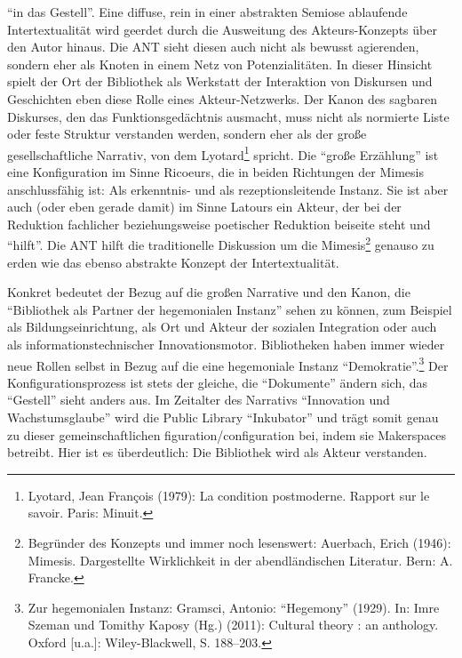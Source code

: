 \enquote{in das Gestell}. Eine diffuse, rein in einer abstrakten Semiose
ablaufende Intertextualität wird geerdet durch die Ausweitung des
Akteurs-Konzepts über den Autor hinaus. Die ANT sieht diesen auch nicht
als bewusst agierenden, sondern eher als Knoten in einem Netz von
Potenzialitäten. In dieser Hinsicht spielt der Ort der Bibliothek als
Werkstatt der Interaktion von Diskursen und Geschichten eben diese Rolle
eines Akteur-Netzwerks. Der Kanon des sagbaren Diskurses, den das
Funktionsgedächtnis ausmacht, muss nicht als normierte Liste oder feste
Struktur verstanden werden, sondern eher als der große gesellschaftliche
Narrativ, von dem Lyotard\footnote{Lyotard, Jean François (1979): La
  condition postmoderne. Rapport sur le savoir. Paris: Minuit.} spricht.
Die \enquote{große Erzählung} ist eine Konfiguration im Sinne Ricoeurs,
die in beiden Richtungen der Mimesis anschlussfähig ist: Als erkenntnis-
und als rezeptionsleitende Instanz. Sie ist aber auch (oder eben gerade
damit) im Sinne Latours ein Akteur, der bei der Reduktion fachlicher
beziehungsweise poetischer Reduktion beiseite steht und \enquote{hilft}.
Die ANT hilft die traditionelle Diskussion um die Mimesis\footnote{Begründer
  des Konzepts und immer noch lesenswert: Auerbach, Erich (1946):
  Mimesis. Dargestellte Wirklichkeit in der abendländischen Literatur.
  Bern: A. Francke.} genauso zu erden wie das ebenso abstrakte Konzept
der Intertextualität.

Konkret bedeutet der Bezug auf die großen Narrative und den Kanon, die
\enquote{Bibliothek als Partner der hegemonialen Instanz} sehen zu
können, zum Beispiel als Bildungseinrichtung, als Ort und Akteur der
sozialen Integration oder auch als informationstechnischer
Innovationsmotor. Bibliotheken haben immer wieder neue Rollen selbst in
Bezug auf die eine hegemoniale Instanz \enquote{Demokratie}.\footnote{Zur
  hegemonialen Instanz: Gramsci, Antonio: \enquote{Hegemony} (1929). In:
  Imre Szeman und Tomithy Kaposy (Hg.) (2011): Cultural theory : an
  anthology. Oxford {[}u.a.{]}: Wiley-Blackwell, S. 188--203.} Der
Konfigurationsprozess ist stets der gleiche, die \enquote{Dokumente}
ändern sich, das \enquote{Gestell} sieht anders aus. Im Zeitalter des
Narrativs \enquote{Innovation und Wachstumsglaube} wird die Public
Library \enquote{Inkubator} und trägt somit genau zu dieser
gemeinschaftlichen figuration/configuration bei, indem sie Makerspaces
betreibt. Hier ist es überdeutlich: Die Bibliothek wird als Akteur
verstanden.

